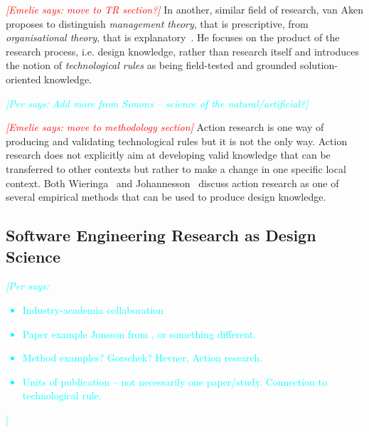 \documentclass[graybox]{svmult}
\newcommand{\emelie}[1]{\textcolor{red}{{\it [Emelie says: #1]}}}
\newcommand{\per}[1]{\textcolor{cyan}{{\it [Per says: #1]}}}
\newcommand{\emelie}[1]{}
\newcommand{\per}[1]{}
\begin{document}

\emelie{move to TR section?} In another, similar field of research, van Aken proposes to distinguish \emph{management theory}, that is prescriptive, from \emph{organisational theory}, that is explanatory~\cite{van_aken_management_2005}. He focuses on the product of the research process, i.e. design knowledge, rather than research itself and introduces the notion of \emph{technological rules} as being field-tested and grounded solution-oriented knowledge. 

\per{Add more from Simons -- science of the natural/artificial?}

\emelie{move to methodology section} Action research is one way of producing and validating technological rules but it is not the only way. Action research does not explicitly aim at developing valid knowledge that can be transferred to other contexts but rather to make a change in one specific local context. Both Wieringa~\cite{wieringa_technical_2012} and Johannesson~\cite{johannesson_introduction_2014} discuss action research as one of several empirical methods that can be used to produce design knowledge.






\subsection{Software Engineering Research as Design Science}
\per{\begin{itemize}
\item Industry-academia collaboration
\item Paper example Jonsson \cite{JonssonBug15} from \cite{StoreyESEM17}, or something different.
\item Method examples? Gorschek? \cite{GorschekSW2006} Hevner, Action research.
\item Units of publication -- not necessarily one paper/study. Connection to technological rule.
\end{itemize}}
\end{document}
